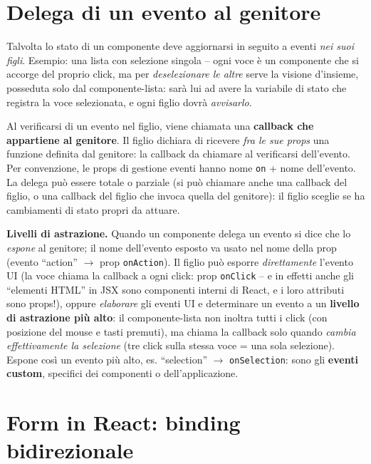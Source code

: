 \section{Delega di un evento al genitore}

Talvolta lo stato di un componente deve aggiornarsi in seguito a eventi \emph{nei suoi
figli}. Esempio: una lista con selezione singola -- ogni voce \`e un componente che si
accorge del proprio click, ma per \emph{deselezionare le altre} serve la visione d'insieme,
posseduta solo dal componente-lista: sar\`a lui ad avere la variabile di stato che registra
la voce selezionata, e ogni figlio dovr\`a \emph{avvisarlo}.

\begin{definizione}
Al verificarsi di un evento nel figlio, viene chiamata una \textbf{callback che appartiene al
genitore}. Il figlio dichiara di ricevere \emph{fra le sue props} una funzione definita dal
genitore: la callback da chiamare al verificarsi dell'evento. Per convenzione, le props di
gestione eventi hanno nome \texttt{on} + nome dell'evento. La delega pu\`o essere totale o
parziale (si pu\`o chiamare anche una callback del figlio, o una callback del figlio che
invoca quella del genitore): il figlio sceglie se ha cambiamenti di stato propri da attuare.
\end{definizione}

\textbf{Livelli di astrazione.} Quando un componente delega un evento si dice che lo
\emph{espone} al genitore; il nome dell'evento esposto va usato nel nome della prop
(evento ``action'' $\rightarrow$ prop \texttt{onAction}). Il figlio pu\`o esporre
\emph{direttamente} l'evento UI (la voce chiama la callback a ogni click: prop
\texttt{onClick} -- e in effetti anche gli ``elementi HTML'' in JSX sono componenti interni
di React, e i loro attributi sono props!), oppure \emph{elaborare} gli eventi UI e
determinare un evento a un \textbf{livello di astrazione pi\`u alto}: il componente-lista non
inoltra tutti i click (con posizione del mouse e tasti premuti), ma chiama la callback solo
quando \emph{cambia effettivamente la selezione} (tre click sulla stessa voce = una sola
selezione). Espone cos\`i un evento pi\`u alto, es. ``selection'' $\rightarrow$
\texttt{onSelection}: sono gli \textbf{eventi custom}, specifici dei componenti o
dell'applicazione.

\section{Form in React: binding bidirezionale}

